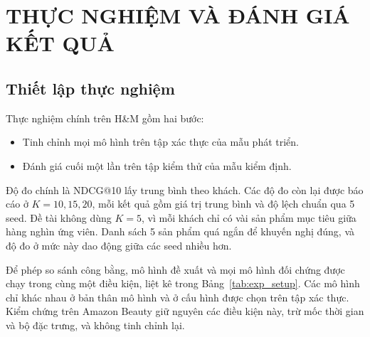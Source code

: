 \chapter{THỰC NGHIỆM VÀ ĐÁNH GIÁ KẾT QUẢ}
\label{chap:thucnghiem}

\section{Thiết lập thực nghiệm}
\label{sec:exp_config}

Thực nghiệm chính trên H\&M gồm hai bước:
\begin{itemize}
    \item Tinh chỉnh mọi mô hình trên tập xác thực của mẫu phát triển.
    \item Đánh giá cuối một lần trên tập kiểm thử của mẫu kiểm định.
\end{itemize}

Độ đo chính là NDCG@10 lấy trung bình theo khách. Các độ đo còn lại được báo cáo ở $K = 10, 15, 20$, mỗi kết quả gồm giá trị trung bình và độ lệch chuẩn qua 5 seed. Đề tài không dùng $K = 5$, vì mỗi khách chỉ có vài sản phẩm mục tiêu giữa hàng nghìn ứng viên. Danh sách 5 sản phẩm quá ngắn để khuyến nghị đúng, và độ đo ở mức này dao động giữa các seed nhiều hơn.

Để phép so sánh công bằng, mô hình đề xuất và mọi mô hình đối chứng được chạy trong cùng một điều kiện, liệt kê trong Bảng~\ref{tab:exp_setup}. Các mô hình chỉ khác nhau ở bản thân mô hình và ở cấu hình được chọn trên tập xác thực. Kiểm chứng trên Amazon Beauty giữ nguyên các điều kiện này, trừ mốc thời gian và bộ đặc trưng, và không tinh chỉnh lại.

